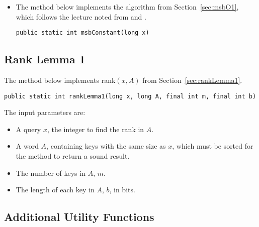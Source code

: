 \begin{itemize}
    \item
    The method below implements the algorithm from Section~\ref{sec:msbO1}, which follows the lecture noted from \cite{erikdemainelec12} and \cite{nelsonjelanilec2}.
    \begin{lstlisting}
public static int msbConstant(long x)
    \end{lstlisting}
    
\end{itemize}

\subsection{Rank Lemma 1}

The method below implements rank$(x,A)$ from Section~\ref{sec:rankLemma1}.
\begin{lstlisting}
public static int rankLemma1(long x, long A, final int m, final int b)
\end{lstlisting}
The input parameters are:
\begin{itemize}
    \item
    A query $x$, the integer to find the rank in $A$.
    
    \item
    A word $A$, containing keys with the same size as $x$, which must be sorted for the method to return a sound result.
    
    \item
    The number of keys in $A$, $m$.
    
    \item
    The length of each key in $A$, $b$, in bits.
\end{itemize}

\subsection{Additional Utility Functions}

